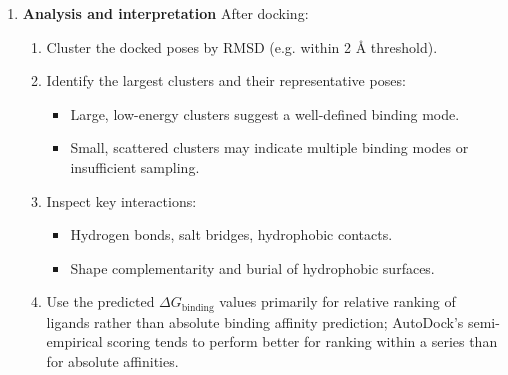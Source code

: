 \documentclass[12pt, a4paper]{article}
\begin{document}
\begin{enumerate}
\begin{enumerate}
\begin{enumerate}
  \item Run AutoDock with the prepared DPF:
  \begin{itemize}
    \item AutoDock reads the receptor and ligand PDBQT files and the AutoGrid maps.
    \item It initialises random ligand poses and starts LGA runs according to the specified parameters.
  \end{itemize}
  \item AutoDock outputs a docking log file (DLG) containing:
  \begin{itemize}
    \item For each run: the best pose found, its estimated binding free energy $\Delta G_{\text{binding}}$, and the corresponding estimated inhibition constant $K_i$.
    \item Detailed information about the genetic algorithm progress (if enabled).
  \end{itemize}
\end{enumerate}
\end{enumerate}
  \item \textbf{Analysis and interpretation}
  After docking:
\begin{enumerate}
  \item Cluster the docked poses by RMSD (e.g. within 2 \r{A} threshold).
  \item Identify the largest clusters and their representative poses:
  \begin{itemize}
    \item Large, low-energy clusters suggest a well-defined binding mode.
    \item Small, scattered clusters may indicate multiple binding modes or insufficient sampling.
  \end{itemize}
  \item Inspect key interactions:
  \begin{itemize}
    \item Hydrogen bonds, salt bridges, hydrophobic contacts.
    \item Shape complementarity and burial of hydrophobic surfaces.
  \end{itemize}
  \item Use the predicted $\Delta G_{\text{binding}}$ values primarily for relative ranking of ligands rather than absolute binding affinity prediction; AutoDock's semi-empirical scoring tends to perform better for ranking within a series than for absolute affinities.\cite{CH7_Huey2007,CH7_Morris2009}
\end{enumerate}
\end{enumerate}
\end{document}
